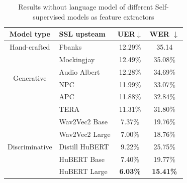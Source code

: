 \begin{table}[ht]
  \centering
  \begin{tabular}{clcc}
  \hline
  Model type                      & SSL upsteam    & UER$\downarrow$ & WER $\downarrow$ \\ \hline
  Hand-crafted                    & Fbanks         & 12.29\%                                                           & 35.14            \\ \hline
  \multirow{4}{*}{Generative}     & Mockingjay     & 12.49\%                                                           & 35.08\%          \\
                                  & Audio Albert   & 12.28\%                                                           & 34.69\%          \\
                                  & NPC   & 11.99\%                                                           & 33.07\%          \\
                                  & APC            & 11.88\%                                                           & 32.84\%          \\
                                  & TERA           & 11.31\%                                                           & 31.80\%          \\ \hline
  \multirow{5}{*}{Discriminative} & Wav2Vec2 Base  & 7.37\%                                                            & 19.76\%          \\
                                  & Wav2Vec2 Large & 7.00\%                                                            & 18.76\%          \\
                                  & Distill HuBERT & 9.22\%                                                            & 25.75\%          \\
                                  & HuBERT Base    & 7.40\%                                                            & 19.77\%          \\
                                  & HuBERT Large   & \textbf{6.03\%}                                                   & \textbf{15.41\%} \\ \hline
  \end{tabular}
  \caption{Results without language model of different Self-supervised models as feature extractors}
\label{tab:ssl}
  \end{table}

